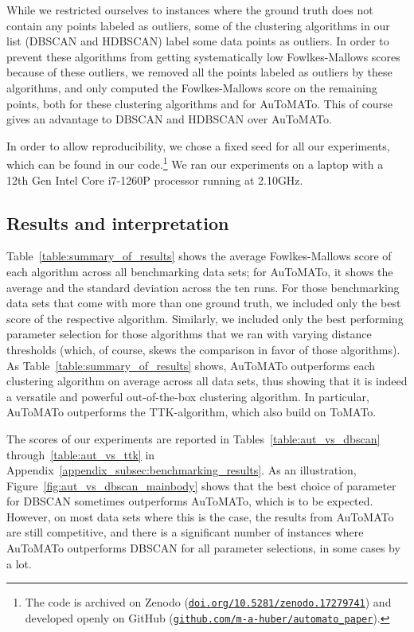 \documentclass[10pt]{article} %
\theoremstyle{plain}
\newcommand{\aut}{AuToMATo\xspace}
\newcommand{\tom}{ToMATo\xspace}
\begin{document}
While we restricted ourselves to instances where the ground truth does not contain any points labeled as outliers, some of the clustering algorithms in our list (DBSCAN and HDBSCAN) label some data points as outliers. In order to prevent these algorithms from getting systematically low Fowlkes-Mallows scores because of these outliers, we removed all the points labeled as outliers by these algorithms, and only computed the Fowlkes-Mallows score on the remaining points, both for these clustering algorithms and for \aut. This of course gives an advantage to DBSCAN and HDBSCAN over \aut.

In order to allow reproducibility, we chose a fixed seed for all our experiments, which can be found in our code.\footnote{
    The code is archived on Zenodo (\href{https://doi.org/10.5281/zenodo.17279741}{\nolinkurl{doi.org/10.5281/zenodo.17279741}}) and developed openly on GitHub (\href{https://github.com/m-a-huber/automato_paper}{\nolinkurl{github.com/m-a-huber/automato\_paper}}).
}
We ran our experiments on a laptop with a 12th Gen Intel Core i7-1260P processor running at 2.10GHz.

\subsection{Results and interpretation}\label{subsec:results_and_comparison}

Table~\ref{table:summary_of_results} shows the average Fowlkes-Mallows score of each algorithm across all benchmarking data sets; for \aut, it shows the average and the standard deviation across the ten runs. For those benchmarking data sets that come with more than one ground truth, we included only the best score of the respective algorithm.
Similarly, we included only the best performing parameter selection for those algorithms that we ran with varying distance thresholds (which, of course, skews the comparison in favor of those algorithms).
As Table~\ref{table:summary_of_results} shows, \aut outperforms each clustering algorithm on average across all data sets, thus showing that it is indeed a versatile and powerful out-of-the-box clustering algorithm.
In particular, \aut outperforms the TTK-algorithm, which also build on \tom.



The scores of our experiments are reported in Tables~\ref{table:aut_vs_dbscan} through~\ref{table:aut_vs_ttk} in Appendix~\ref{appendix_subsec:benchmarking_results}.
As an illustration, Figure~\ref{fig:aut_vs_dbscan_mainbody} shows that the best choice of parameter for DBSCAN sometimes outperforms \aut, which is to be expected. However, on most data sets where this is the case, the results from \aut are still competitive, and there is a significant number of instances where \aut outperforms DBSCAN for all parameter selections, in some cases by a lot.
\end{document}
